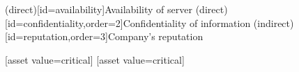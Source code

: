 \documentclass{article}
\begin{document}
\begin{center}
\begin{corasassetdiagram}[x=1cm,y=1cm,asset columns=3]
  \asset(direct)[id=availability]{Availability of server}
  \asset(direct)[id=confidentiality,order=2]{Confidentiality of information}
  \asset(indirect)[id=reputation,order=3]{Company's reputation}

  [asset value=critical]
  [asset value=critical]
\end{corasassetdiagram}
\end{center}
\end{document}
